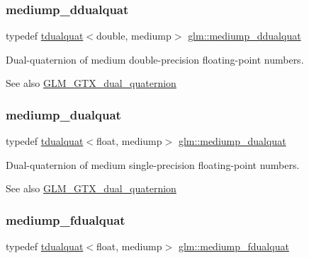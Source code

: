 \subsubsection{\texorpdfstring{mediump\+\_\+ddualquat}{mediump\_ddualquat}}
{\footnotesize\ttfamily typedef \hyperlink{structglm_1_1tdualquat}{tdualquat}$<$double, mediump$>$ \hyperlink{group__gtx__dual__quaternion_ga5727116ab20b2a1d40387766d723dd6c}{glm\+::mediump\+\_\+ddualquat}}

Dual-\/quaternion of medium double-\/precision floating-\/point numbers.

\begin{DoxySeeAlso}{See also}
\hyperlink{group__gtx__dual__quaternion}{G\+L\+M\+\_\+\+G\+T\+X\+\_\+dual\+\_\+quaternion} 
\end{DoxySeeAlso}
\mbox{\label{group__gtx__dual__quaternion_gaa88fe93eb823d1aba8d6df8028572cb5}} 
\subsubsection{\texorpdfstring{mediump\+\_\+dualquat}{mediump\_dualquat}}
{\footnotesize\ttfamily typedef \hyperlink{structglm_1_1tdualquat}{tdualquat}$<$float, mediump$>$ \hyperlink{group__gtx__dual__quaternion_gaa88fe93eb823d1aba8d6df8028572cb5}{glm\+::mediump\+\_\+dualquat}}

Dual-\/quaternion of medium single-\/precision floating-\/point numbers.

\begin{DoxySeeAlso}{See also}
\hyperlink{group__gtx__dual__quaternion}{G\+L\+M\+\_\+\+G\+T\+X\+\_\+dual\+\_\+quaternion} 
\end{DoxySeeAlso}
\mbox{\label{group__gtx__dual__quaternion_ga93e9def86ffeedd48d9c79a6afacfa6c}} 
\subsubsection{\texorpdfstring{mediump\+\_\+fdualquat}{mediump\_fdualquat}}
{\footnotesize\ttfamily typedef \hyperlink{structglm_1_1tdualquat}{tdualquat}$<$float, mediump$>$ \hyperlink{group__gtx__dual__quaternion_ga93e9def86ffeedd48d9c79a6afacfa6c}{glm\+::mediump\+\_\+fdualquat}}

